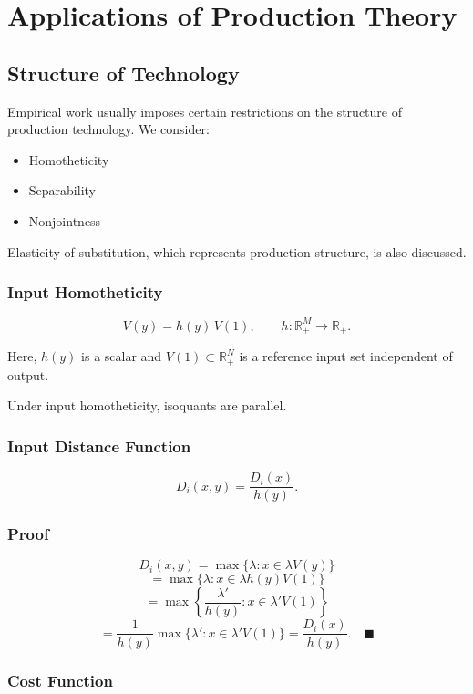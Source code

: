 \chapter{Applications of  Production Theory}


\section{Structure of Technology}

Empirical work usually imposes certain restrictions on the structure
of production technology. We consider:

\begin{itemize}
    \item Homotheticity
    \item Separability
    \item Nonjointness
\end{itemize}

Elasticity of substitution, which represents production structure,
is also discussed.

\subsection{Input Homotheticity}

\[
V(y)=h(y)\,V(1),
\qquad
h:\mathbb{R}_+^M \to \mathbb{R}_+.
\]

Here, $h(y)$ is a scalar and $V(1)\subset \mathbb{R}_+^N$
is a reference input set independent of output.

Under input homotheticity, isoquants are parallel.

\subsection*{Input Distance Function}

\[
D_i(x,y)=\frac{D_i(x)}{h(y)}.
\]

\subsection*{Proof}

\[
D_i(x,y)
=
\max \{\lambda : x \in \lambda V(y)\}
\]
\[
=
\max \{\lambda : x \in \lambda h(y)V(1)\}
\]
\[
=
\max \left\{ \frac{\lambda'}{h(y)} : x \in \lambda' V(1) \right\}
\]
\[
=
\frac{1}{h(y)} \max \{\lambda' : x \in \lambda' V(1)\}
=
\frac{D_i(x)}{h(y)}.
\quad \blacksquare
\]

\subsection*{Cost Function}

